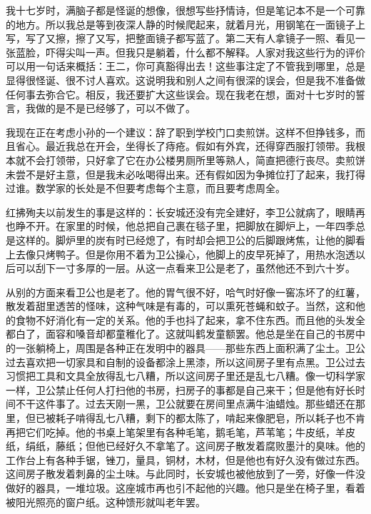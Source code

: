 我十七岁时，满脑子都是怪诞的想像，很想写些抒情诗，但是笔记本不是一个可靠的地方。所以我总是等到夜深人静的时候爬起来，就着月光，用钢笔在一面镜子上写，写了又擦，擦了又写，把整面镜子都写蓝了。第二天有人拿镜子一照、看见一张蓝脸，吓得尖叫一声。但我只是躺着，什么都不解释。人家对我这些行为的评价可以用一句话来概括：王二，你可真豁得出去！这些事注定了不管我到哪里，总是显得很怪诞、很不讨人喜欢。这说明我和别人之间有很深的误会，但是我不准备做任何事去弥合它。相反，我还要扩大这些误会。现在我老在想，面对十七岁时的誓言，我做的是不是已经够了，可以不做了。 

我现在正在考虑小孙的一个建议：辞了职到学校门口卖煎饼。这样不但挣钱多，而且省心。最近我总在开会，坐得长了痔疮。假如有外宾，还得穿西服打领带。我根本就不会打领带，只好拿了它在办公楼男厕所里等熟人，简直把德行丧尽。卖煎饼未尝不是好主意，但是我未必吆喝得出来。还有假如因为争摊位打了起来，我打得过谁。数学家的长处是不但要考虑每个主意，而且要考虑周全。 

红拂殉夫以前发生的事是这样的：长安城还没有完全建好，李卫公就病了，眼睛再也睁不开。在家里的时候，他总把自己裹在毯子里，把脚放在脚炉上，一年四季总是这样的。脚炉里的炭有时已经熄了，有时却会把卫公的后脚跟烤焦，让他的脚看上去像只烤鸭子。但是你用不着为卫公操心，他脚上的皮早死掉了，用热水泡透以后可以刮下一寸多厚的一层。从这一点看来卫公是老了，虽然他还不到六十岁。 

从别的方面来看卫公也是老了。他的胃气很不好，哈气时好像一窖冻坏了的红薯，散发着甜里透苦的怪味，这种气味是有毒的，可以熏死苍蝇和蚊子。当然，这和他的食物不好消化有一定的关系。他的手也抖了起来，拿不住东西。而且他的头发全都白了，面容和嗓音却都童稚化了。这就叫鹤发童额罢。他总是坐在自己的书房中的一张躺椅上，周围是各种正在发明中的器具——那些东西上面积满了尘土。卫公过去喜欢把一切家具和自制的设备都涂上黑漆，所以这间房子里有点黑。卫公过去习惯把工具和文具全放得乱七八糟，所以这间房子里还是乱七八糟。像一切科学家一样，卫公禁止任何人打扫他的书房，扫房子的事都是自己来干；但是他有好长时间不干这件事了。过去天刚一黑，卫公就要在房间里点满牛油蜡烛。那些蜡还在那里，但已被耗子啃得乱七八糟，剩下的都太陈了，啃起来像肥皂，所以耗子也不肯再把它们吃掉。他的书桌上笔架里有各种毛笔，鹅毛笔，芦苇笔；牛皮纸，羊皮纸，绢纸，藤纸；但他已经好久不拿笔了。这间房子散发着腐败墨汁的臭味。他的工作台上有各种手锯，锉刀，量具，铜材，木材，但是他也有好久没有做过东西。这间房子散发着刺鼻的尘土味。与此同时，长安城也被他放到了一旁，好像一件没做好的器具，一堆垃圾。这座城市再也引不起他的兴趣。他只是坐在椅子里，看着被阳光照亮的窗户纸。这种馈形就叫老年罢。 

